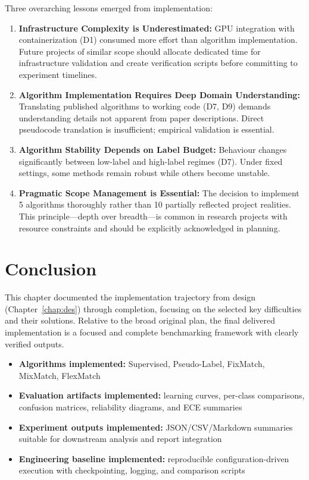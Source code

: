 Three overarching lessons emerged from implementation:

\begin{enumerate}
    \item \textbf{Infrastructure Complexity is Underestimated:} GPU integration with containerization (D1) consumed more effort than algorithm implementation. Future projects of similar scope should allocate dedicated time for infrastructure validation and create verification scripts before committing to experiment timelines.

    \item \textbf{Algorithm Implementation Requires Deep Domain Understanding:} Translating published algorithms to working code (D7, D9) demands understanding details not apparent from paper descriptions. Direct pseudocode translation is insufficient; empirical validation is essential.

    \item \textbf{Algorithm Stability Depends on Label Budget:} Behaviour changes significantly between low-label and high-label regimes (D7). Under fixed settings, some methods remain robust while others become unstable.

    \item \textbf{Pragmatic Scope Management is Essential:} The decision to implement 5 algorithms thoroughly rather than 10 partially reflected project realities. This principle---depth over breadth---is common in research projects with resource constraints and should be explicitly acknowledged in planning.
\end{enumerate}

\section{Conclusion}

This chapter documented the implementation trajectory from design (Chapter~\ref{chap:des}) through completion, focusing on the selected key difficulties and their solutions. Relative to the broad original plan, the final delivered implementation is a focused and complete benchmarking framework with clearly verified outputs.

\begin{itemize}
    \item \textbf{Algorithms implemented:} Supervised, Pseudo-Label, FixMatch, MixMatch, FlexMatch
    \item \textbf{Evaluation artifacts implemented:} learning curves, per-class comparisons, confusion matrices, reliability diagrams, and ECE summaries
    \item \textbf{Experiment outputs implemented:} JSON/CSV/Markdown summaries suitable for downstream analysis and report integration
    \item \textbf{Engineering baseline implemented:} reproducible configuration-driven execution with checkpointing, logging, and comparison scripts
\end{itemize}


